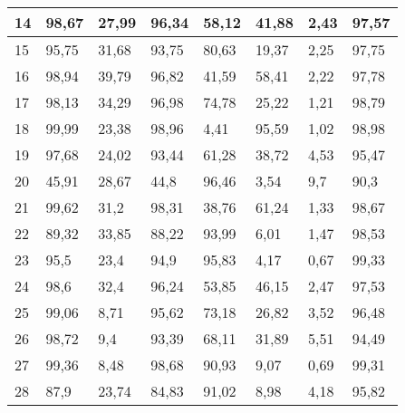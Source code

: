 \begin{longtable}[c]{|l|l|l|l|l|l|l|l|}
14              & 98,67        & 27,99        & 96,34       & 58,12         & 41,88         & 2,43          & 97,57         \\ \hline
15              & 95,75        & 31,68        & 93,75       & 80,63         & 19,37         & 2,25          & 97,75         \\ \hline
16              & 98,94        & 39,79        & 96,82       & 41,59         & 58,41         & 2,22          & 97,78         \\ \hline
17              & 98,13        & 34,29        & 96,98       & 74,78         & 25,22         & 1,21          & 98,79         \\ \hline
18              & 99,99        & 23,38        & 98,96       & 4,41          & 95,59         & 1,02          & 98,98         \\ \hline
19              & 97,68        & 24,02        & 93,44       & 61,28         & 38,72         & 4,53          & 95,47         \\ \hline
20              & 45,91        & 28,67        & 44,8        & 96,46         & 3,54          & 9,7           & 90,3          \\ \hline
21              & 99,62        & 31,2         & 98,31       & 38,76         & 61,24         & 1,33          & 98,67         \\ \hline
22              & 89,32        & 33,85        & 88,22       & 93,99         & 6,01          & 1,47          & 98,53         \\ \hline
23              & 95,5         & 23,4         & 94,9        & 95,83         & 4,17          & 0,67          & 99,33         \\ \hline
24              & 98,6         & 32,4         & 96,24       & 53,85         & 46,15         & 2,47          & 97,53         \\ \hline
25              & 99,06        & 8,71         & 95,62       & 73,18         & 26,82         & 3,52          & 96,48         \\ \hline
26              & 98,72        & 9,4          & 93,39       & 68,11         & 31,89         & 5,51          & 94,49         \\ \hline
27              & 99,36        & 8,48         & 98,68       & 90,93         & 9,07          & 0,69          & 99,31         \\ \hline
28              & 87,9         & 23,74        & 84,83       & 91,02         & 8,98          & 4,18          & 95,82         \\ \hline

\end{longtable}
